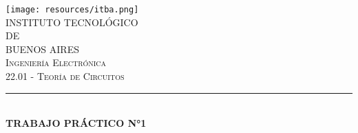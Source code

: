 



%

\begin{titlepage}
\newcommand{\HRule}{\rule{\linewidth}{0.5mm}} %

\center

\texttt{[image: resources/itba.png]}\\[1cm] %
 

\textsc{\Large INSTITUTO TECNOLÓGICO \\DE \\[0.3cm]BUENOS AIRES }\\[0.6cm] %

\textsc{\Large Ingeniería Electrónica }\\[0.3cm]
\textsc{\large 22.01 - Teoría de Circuitos}\\[0.5cm] %


\HRule \\[0.4cm]
{ \huge \bfseries TRABAJO PRÁCTICO N°1\\ [0.3cm]}


\end{titlepage}
